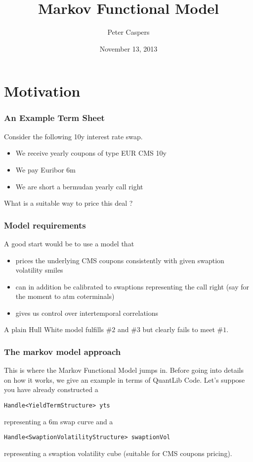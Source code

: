 \message{ !name(mfpresql.tex)}\documentclass{beamer}
\begin{document}

\title{Markov Functional Model}  
\author{Peter Caspers}
\date{November 13, 2013} 

\frame{\titlepage} 


\section{Motivation}

\begin{frame}
\frametitle{An Example Term Sheet}
Consider the following 10y interest rate swap.
\begin{itemize}
\item We receive yearly coupons of type EUR CMS 10y
\item We pay Euribor 6m
\item We are short a bermudan yearly call right
\end{itemize}
 What is a suitable way to price this deal ?
\end{frame}



\begin{frame}
\frametitle{Model requirements}
A good start would be to use a model that
\begin{itemize}
\item prices the underlying CMS coupons consistently with given swaption volatility smiles
\item can in addition be calibrated to swaptions representing the call right (say for the moment to atm coterminals)
\item gives us control over intertemporal correlations
\end{itemize}
A plain Hull White model fulfills $\#2$ and $\#3$ but clearly fails to meet $\#1$.
\end{frame}



\begin{frame}[fragile]
\frametitle{The markov model approach}
This is where the Markov Functional Model jumps in. Before going into details on how it works, we give
an example in terms of QuantLib Code. Let's suppose you have already constructed a 
\begin{verbatim}
Handle<YieldTermStructure> yts
\end{verbatim}
representing a 6m swap curve and a 
\begin{verbatim}
Handle<SwaptionVolatilityStructure> swaptionVol
\end{verbatim}
representing a swaption volatility cube (suitable for CMS coupons pricing).
\end{frame}
\end{document}
